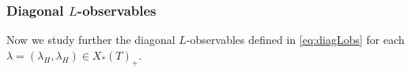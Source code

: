 \documentclass[reqno]{amsart}
\numberwithin{equation}{section}
\numberwithin{equation}{section}
\begin{document}














\subsubsection{Diagonal \texorpdfstring{$L$}{L}-observables}
Now we study further the diagonal $L$-observables defined in \eqref{eq:diagLobs} for each $\lambda=(\lambda_H,\lambda_H)\in X_*(T)_+$.
\end{document}
